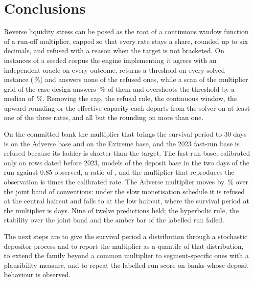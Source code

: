 \section{Conclusions}
\label{sec:conclusions}

Reverse liquidity stress can be posed as the root of a continuous window function of a run-off multiplier, capped so that every rate stays a share, rounded up to six decimals, and refused with a reason when the target is not bracketed. On \kInst{} instances of a seeded corpus the engine implementing it agrees with an independent oracle on every outcome, returns a threshold on every solved instance (\kPThr{}\,\%) and answers none of the \kRefused{} refused ones, while a scan of the multiplier grid of the case design answers \kGFalse{}\,\% of them and overshoots the threshold by a median of \kGErrPc{}\,\%. Removing the cap, the refusal rule, the continuous window, the upward rounding or the effective capacity each departs from the solver on at least one of the three rates, and all but the rounding on more than one.

On the committed bank the multiplier that brings the survival period to 30 days is \mAdv{} on the Adverse base and \mExt{} on the Extreme base, and the 2023 fast-run base is refused because its ladder is shorter than the target. The fast-run base, calibrated only on rows dated before 2023, models \svbModel{} of the deposit base in the two days of the run against 0.85 observed, a ratio of \svbRatio{}, and the multiplier that reproduces the observation is \mSvb{} times the calibrated rate. The Adverse multiplier moves by \jointDevAdv{}\,\% over the joint band of conventions: under the slow monetisation schedule it is refused at the central haircut and falls to \lowSlowM{} at the low haircut, where the survival period at the multiplier is \lowSlowSp{} days. Nine of twelve predictions held; the hyperbolic rule, the stability over the joint band and the amber bar of the labelled run failed.

The next steps are to give the survival period a distribution through a stochastic depositor process and to report the multiplier as a quantile of that distribution, to extend the family beyond a common multiplier to segment-specific ones with a plausibility measure, and to repeat the labelled-run score on banks whose deposit behaviour is observed.
